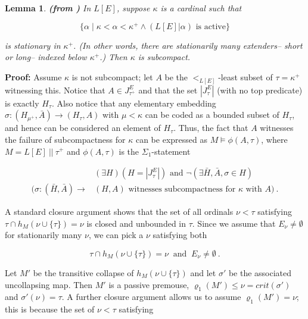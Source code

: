 \documentclass[12pt]{article}
\newtheorem{lem}[thm]{Lemma}
\begin{document}
\begin{lem} \textbf{(from \cite{zeman square proof})} In $L[E]$, suppose $\kappa$ is a cardinal such that 

\[
\{ \alpha \mid \kappa < \alpha < \kappa^+ \wedge ( L[E] | \alpha) \text{ is active} \}
\]

is stationary in $\kappa^+$.  (In other words, there are stationarily many extenders-- short or long-- indexed below $\kappa^+$.)  Then $\kappa$ is subcompact.
\end{lem}



\textbf{Proof:}  Assume $\kappa$ is not subcompact; let $A$ be the $<_{L[E]}$-least subset of $\tau = \kappa^+$ witnessing this.  Notice that $A \in J^E_{\tau^+}$ and that the set $| J^E_\tau | $ (with no top predicate) is exactly $H_\tau$.  Also notice that any elementary embedding $\sigma : ( H_{\mu^+} , \bar{A} ) \longrightarrow (H_\tau , A )$ with $\mu < \kappa$ can be coded as a bounded subset of $H_\tau$, and hence can be considered an element of $H_\tau$.  Thus, the fact that $A$ witnesses the failure of subcompactness for $\kappa$ can be expressed as $M \models \phi (A , \tau )$, where $M = L[E] \ || \ \tau^+ $ and $\phi (A , \tau )$ is the $\Sigma_1$-statement 

\[
\begin{split}
& ( \exists H) (H = | J^E_\tau | ) \text{ and } \neg ( \exists \bar{H} , \bar{A} , \sigma \in H ) \\ 
( \sigma : ( \bar{H} , \bar{A} ) \longrightarrow & ( H , A ) \text{ witnesses subcompactness for } \kappa \text{ with } A ) \ .
\end{split}
\]

\bigskip

A standard closure argument shows that the set of all ordinals $\nu < \tau$ satisfying $\tau \cap h_M (\nu \cup \{ \tau \} ) = \nu$ is closed and unbounded in $\tau$.  Since we assume that $E_\nu \neq \emptyset$ for stationarily many $\nu$, we can pick a $\nu$ satisfying both

\[
\tau \cap h_M ( \nu \cup \{ \tau \} ) = \nu \ \text{ and } \ E_\nu \neq \emptyset \ .
\]

Let $M'$ be the transitive collapse of $h_M (\nu \cup \{ \tau \} )$ and let $\sigma'$ be the associated uncollapsing map.  Then $M'$ is a passive premouse, $\varrho_1 (M' ) \leq \nu = crit (\sigma' )$ and $\sigma' (\nu ) = \tau$.  A further closure argument allows us to assume $\varrho_1 (M' ) = \nu$; this is because the set of $\nu < \tau$ satisfying
\end{document}
